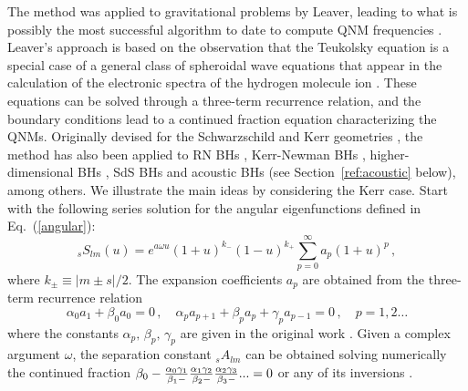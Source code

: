 \documentclass[]{iopart}
\def\be{\begin{equation}}
\def\ee{\end{equation}}
\begin{document}
The method was applied to gravitational problems by Leaver, leading to what is
possibly the most successful algorithm to date to compute QNM frequencies
\cite{Leaver:1985ax,leJMP,Leaver:1986gd}.  Leaver's approach is based on the
observation that the Teukolsky equation is a special case of a general class
of spheroidal wave equations that appear in the calculation of the electronic
spectra of the hydrogen molecule ion \cite{leJMP}.  These equations can be
solved through a three-term recurrence relation, and the boundary conditions
lead to a continued fraction equation characterizing the QNMs.  Originally
devised for the Schwarzschild and Kerr geometries
\cite{Nollertlargen,Onozawa:1996ux,Berti:2003jh,Berti:2004um}, the method has
also been applied to RN BHs \cite{LeaverRN}, Kerr-Newman BHs
\cite{Berti:2005eb}, higher-dimensional BHs
\cite{Cardoso:2003vt,Cardoso:2003qd,Cardoso:2004cj,Morisawa:2004fs}, SdS BHs
\cite{Yoshida:2003zz,Konoplya:2004uk} and acoustic BHs \cite{Cardoso:2004fi}
(see Section~\ref{ref:acoustic} below), among others. We illustrate the main
ideas by considering the Kerr case. Start with the following series solution
for the angular eigenfunctions defined in Eq.~(\ref{angular}):
%
\begin{equation}\label{leavers}
{}_sS_{lm}(u)=e^{a\omega
u}\left(1+u\right)^{k_-}\left(1-u\right)^{k_+} \sum_{p=0}^\infty
a_p(1+u)^p\,,
\end{equation}
%
where $k_{\pm}\equiv |m\pm s|/2$. The expansion coefficients $a_p$ are
obtained from the three-term recurrence relation
%
\be\label{recur} 
\alpha_0 a_{1}+\beta_0 a_{0}=0\,,\quad \alpha_p
a_{p+1}+\beta_p a_{p}+\gamma_p a_{p-1}=0\,, \quad p=1,2\dots \ee
%
where the constants $\alpha_p,\,\beta_p,\,\gamma_p$ are given in the original
work \cite{Leaver:1985ax}.
Given a complex argument $\omega$, the separation constant ${}_sA_{lm}$ can be
obtained solving numerically the continued fraction $\beta_0-
{\frac{\alpha_0\gamma_1}{\beta_1-}} {\alpha_1\gamma_2\over\beta_2-}
{\alpha_2\gamma_3\over\beta_3-} ...=0$ or any of its inversions
\cite{Leaver:1985ax}.
\end{document}
